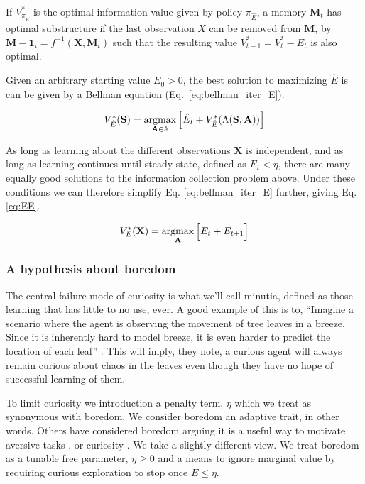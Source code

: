 \begin{definition} \label{theorem:opt_sub} 
   If $V^*_{\pi_{\hat E}}$ is the optimal information value given by policy $\pi_{\hat E}$, a memory $\mathbf{M}_t$ has optimal substructure if the last observation $X$ can be removed from $\mathbf{M}$, by $\mathbf{M-1}_{t} = f^{-1}(\mathbf{X}, \mathbf{M}_t)$ such that the resulting value $V^*_{t-1} = V^*_{t} - E_{t}$ is also optimal. 
\end{definition}

Given an arbitrary starting value $E_0 > 0$, the best solution to maximizing $\hat E$ is can be given by a Bellman equation (Eq.~\ref{eq:bellman_iter_E}).

\begin{equation} 
	\label{eq:bellman_iter_E}
	V^*_{\hat E}(\mathbf{S}) = \operatorname*{argmax}_{\mathbf{A} \in \mathbb{A}} \Big [ \hat E_{t}  + V^*_{\hat E}(\Lambda(\mathbf{S},\mathbf{A})) \Big ]
\end{equation}

As long as learning about the different observations $\mathbf{X}$ is independent, and as long as learning continues until steady-state, defined as $E_t < \eta$, there are many equally good solutions to the information collection problem above. Under these conditions we can therefore simplify Eq. \ref{eq:bellman_iter_E} further, giving Eq. \ref{eq:EE}. 

\begin{equation}
	\label{eq:EE} 
	V_E^{*}(\mathbf{X}) = \operatorname*{argmax}_{\mathbf{A}} \Big [ E_t + E_{t+1} \Big ]
\end{equation}

\subsubsection*{A hypothesis about boredom}
The central failure mode of curiosity is what we'll call minutia, defined as those learning that has little to no use, ever. A good example of this is to, ``Imagine a scenario where the agent is observing the movement of tree leaves in a breeze. Since it is inherently hard to model breeze, it is even harder to predict the location of each leaf'' \cite{Pathak2017}. This will imply, they note, a curious agent will always remain curious about chaos in the leaves even though they have no hope of successful learning of them.

To limit curiosity we introduction a penalty term, $\eta$ which we treat as synonymous with boredom. We consider boredom an adaptive trait, in other words. Others have considered boredom arguing it is a useful way to motivate aversive tasks \citep{Bench2013}, or curiosity \cite{Loewenstein1994}. We take a slightly different view. We treat boredom as a tunable free parameter, $\eta \ge 0$ and a means to ignore marginal value by requiring curious exploration to stop once $E \le \eta$. 


